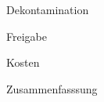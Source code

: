 \begin{frame}{Dekontamination}
\end{frame}



\begin{frame}{Freigabe}
\end{frame}



\begin{frame}{Kosten}
\end{frame}



\begin{frame}{Zusammenfasssung}
\end{frame}

\begin{frame}[allowframebreaks]
  \nocite{*}
  \printbibliography
\end{frame}


